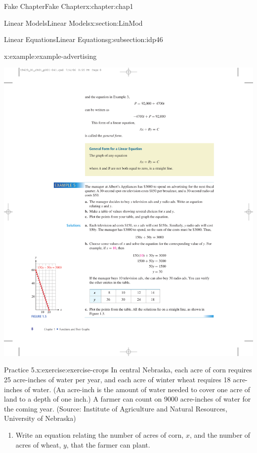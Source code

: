 \documentclass[oneside,10pt,]{book}
\numberwithin{equation}{section}
\begin{document}
\begin{chapterptx}{Fake Chapter}{}{Fake Chapter}{}{}{x:chapter:chap1}
\begin{sectionptx}{Linear Models}{}{Linear Models}{}{}{x:section:LinMod}
\begin{subsectionptx}{Linear Equations}{}{Linear Equations}{}{}{g:subsection:idp46}
\begin{example}{}{x:example:example-advertising}
\begin{enumerate}[label=\alph*]
\begin{sidebyside}{2}{0}{0.02}{0.18}
\begin{sbspanel}{0.5}
\end{sbspanel}%
\begin{sbspanel}{0.3}%
\includegraphics[width=\linewidth]{external/photos/fig-example-advertising.pdf}
\end{sbspanel}%
\end{sidebyside}%
%
\end{enumerate}
%
\end{example}
\begin{inlineexercise}{Practice 5.}{x:exercise:exercise-crops}%
In central Nebraska, each acre of corn requires 25 acre-inches of water per year, and each acre of winter wheat requires 18 acre-inches of water. (An acre-inch is the amount of water needed to cover one acre of land to a depth of one inch.) A farmer can count on 9000 acre-inches of water for the coming year. (Source: Institute of Agriculture and Natural Resources, University of Nebraska)%
\par
%
\begin{enumerate}[label=\alph*.]
\item{}Write an equation relating the number of acres of corn, \(x\text{,}\)  and the number of acres of wheat, \(y\text{,}\)  that the farmer can plant.%

\end{enumerate}
\end{inlineexercise}
\end{subsectionptx}
\end{sectionptx}
\end{chapterptx}
\end{document}
